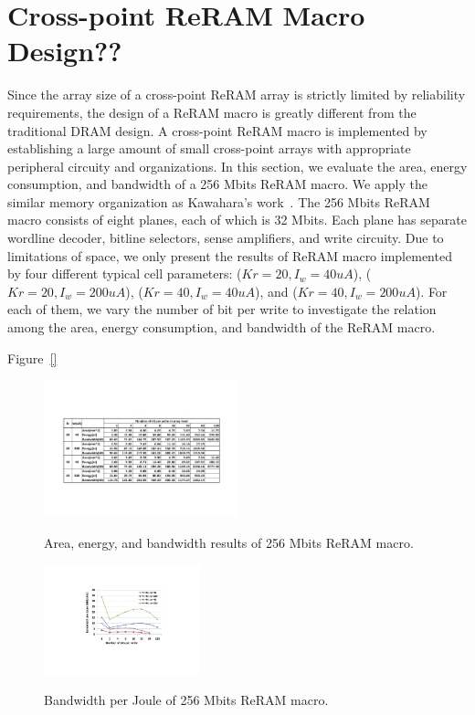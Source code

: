 
\section{Cross-point ReRAM Macro Design??}\label{sec:macro}
Since the array size of a cross-point ReRAM array is strictly limited by
reliability requirements, the design of a ReRAM macro is greatly different
from the traditional DRAM design. A cross-point ReRAM macro is implemented
by establishing a large amount of small cross-point arrays with
appropriate peripheral circuity and organizations. In this section, we
evaluate the area, energy consumption, and bandwidth of a 256 Mbits ReRAM
macro. We apply the similar memory organization as Kawahara's
work~\cite{crossbar_Panasonic}. The 256 Mbits ReRAM macro consists of
eight planes, each of which is 32 Mbits. Each plane has separate wordline
decoder, bitline selectors, sense amplifiers, and write circuity. Due to
limitations of space, we only present the results of ReRAM macro
implemented by four different typical cell parameters: ($Kr=20,
I_w=40uA$), ($Kr=20, I_w=200uA$), ($Kr=40, I_w=40uA$), and ($Kr=40,
I_w=200uA$). For each of them, we vary the number of bit per write to
investigate the relation among the area, energy consumption, and bandwidth
of the ReRAM macro.


Figure~\ref{}
\begin{figure}[!t]
\centering\label{table}
  \includegraphics[width=0.5\textwidth]{./figures/Table}\\
  \caption{Area, energy, and bandwidth results of 256 Mbits ReRAM macro.}
  \vspace{-5pt}
\end{figure}


\begin{figure}[!t]
\centering\label{EpJ}
  \includegraphics[width=0.4\textwidth]{./figures/EpJ}\\
  \caption{Bandwidth per Joule of 256 Mbits ReRAM macro.}
  \vspace{-5pt}
\end{figure}

